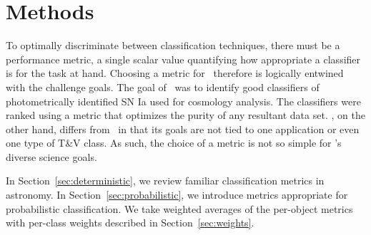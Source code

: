 \section{Methods}
\label{sec:methods}


To optimally discriminate between classification techniques, there must be a performance metric, a single scalar value quantifying how appropriate a classifier is for the task at hand.
Choosing a metric for \plasticc\ therefore is logically entwined with the challenge goals.
The goal of \snphotcc\ was to identify good classifiers of photometrically identified SN Ia used for cosmology analysis.
The classifiers were ranked using a metric that optimizes the purity of any resultant data set.
\plasticc, on the other hand, differs from \snphotcc\ in that its goals are not tied to one application or even one type of T\&V class.
As such, the choice of a metric is not so simple for \plasticc's diverse science goals.


In Section~\ref{sec:deterministic}, we review familiar classification metrics in astronomy.
In Section~\ref{sec:probabilistic}, we introduce metrics appropriate for probabilistic classification.
We take weighted averages of the per-object metrics with per-class weights described in Section~\ref{sec:weights}.

